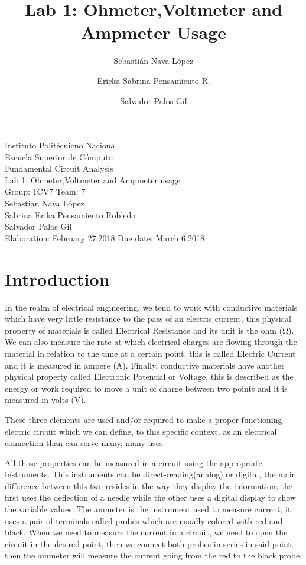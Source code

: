 \documentclass[a4paper]{article}
\title{Lab 1: Ohmeter,Voltmeter and Ampmeter Usage}
\author{
   Sebastián Nava López\\
    \and
    Ericka Sabrina Pensamiento R.\\
    \and
    Salvador Palos Gil
}
\begin{document}
\begin{titlepage}
    \centering
    {\Huge Instituto Politécnicno Nacional}\\[3ex]
    {\huge Escuela Superior de Cómputo}\\[8ex]
    {\huge Fundamental Circuit Analysis}\\[12ex]
    {\Large Lab 1: Ohmeter,Voltmeter and Ampmeter usage}\\[20ex]
    {\Large Group: 1CV7 Team: 7 \\[8ex]
    Sebastian Nava López\\[4ex]
    Sabrina Erika Pensamiento Robledo\\[4ex]
    Salvador Palos Gil\\[18ex]
    }
    \large{Elaboration: February 27,2018\hspace{8em} Due date: March 6,2018}
    

\end{titlepage}
\tableofcontents
\newpage
\section{Introduction}
In the realm of electrical engineering, we tend to work with conductive materials which have very little resistance to the pass of an electric current, this physical property of materials is called Electrical Resistance and its unit is the ohm (\si{\ohm}). We can also measure the rate at which electrical charges are flowing through the material in relation to the time at a certain point, this is called Electric Current and it is measured in ampere (A). Finally, conductive materials have another physical property called Electronic Potential or Voltage, this is described as the energy or work required to move a unit of charge between two points and it is measured in volts (V). 

These three elements are used and/or required to make a proper functioning electric circuit which we can define, to this specific context, as an electrical connection than can serve many, many uses.

All those properties can be measured in a circuit using the appropriate instruments. This instruments can be direct-reading(analog) or digital, the main difference between this two resides in the way they display the information; the first uses the deflection of a needle while the other uses a digital display to show the variable values. The ammeter is the instrument used to measure current, it uses a pair of terminals called probes which are usually colored with red and black. When we need to measure the current in a circuit, we need to open the circuit in the desired point, then we connect both probes in series in said point, then the ammeter will measure the current going from the red to the black probe. 
\end{document}
